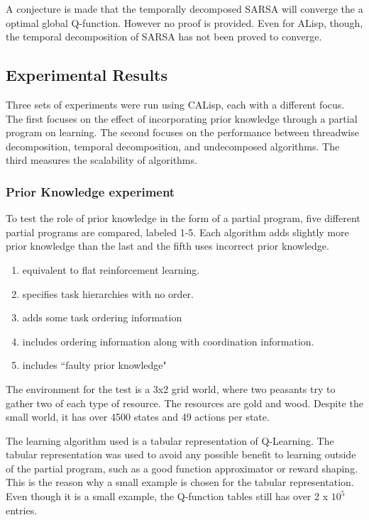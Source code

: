 \documentclass[jair,twoside,11pt,theapa]{article}
\begin{document}
A conjecture is made that the temporally decomposed SARSA will converge the a optimal global Q-function. However no proof is provided. Even for ALisp, though, the temporal decomposition of SARSA has not been proved to converge. 


\subsection{Experimental Results}
\label{Experiments}
Three sets of experiments were run using CALisp, each with a different focus. The first focuses on the effect of incorporating prior knowledge through a partial program on learning. The second focuses on the performance between threadwise decomposition, temporal decomposition, and undecomposed algorithms. The third measures the scalability of algorithms. 

\subsubsection{Prior Knowledge experiment}
To test the role of prior knowledge in the form of a partial program, five different partial programs are compared, labeled 1-5. Each algorithm adds slightly more prior knowledge than the last and the fifth uses incorrect prior knowledge. 
\begin{enumerate}
\item equivalent to flat reinforcement learning.
\item specifies task hierarchies with no order.
\item adds some task ordering information
\item includes ordering information along with coordination information.
\item includes ``faulty prior knowledge"
\end{enumerate}

The environment for the test is a 3x2 grid world, where two peasants try to gather two of each type of resource. The resources are gold and wood. Despite the small world, it has over 4500 states and 49 actions per state. 

The learning algorithm used is a tabular representation of Q-Learning. The tabular representation was used to avoid any possible benefit to learning outside of the partial program, such as a good function approximator or reward shaping. This is the reason why a small example is chosen for the tabular representation. Even though it is a small example, the Q-function tables still has over 2 x $10^5$ entries. 
\end{document}
